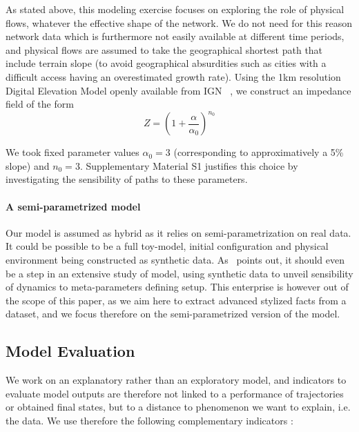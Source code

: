 \documentclass[Royal,sageh,times]{sagej}
\begin{document}
As stated above, this modeling exercise focuses on exploring the role of physical flows, whatever the effective shape of the network. We do not need for this reason network data which is furthermore not easily available at different time periods, and physical flows are assumed to take the geographical shortest path that include terrain slope (to avoid geographical absurdities such as cities with a difficult access having an overestimated growth rate). Using the 1km resolution Digital Elevation Model openly available from IGN~\cite{}%
, we construct an impedance field of the form
\[
Z = \left(1 + \frac{\alpha}{\alpha_0}\right)^{n_0}
\]

We took fixed parameter values $\alpha_0 = 3$ (corresponding to approximatively a 5\% slope) and $n_0 = 3$. Supplementary Material S1 justifies this choice by investigating the sensibility of paths to these parameters.




\paragraph{A semi-parametrized model}

Our model is assumed as hybrid as it relies on semi-parametrization on real data. It could be possible to be a full toy-model, initial configuration and physical environment being constructed as synthetic data. As~\cite{raimbault2016generation} points out, it should even be a step in an extensive study of model, using synthetic data to unveil sensibility of dynamics to meta-parameters defining setup. This enterprise is however out of the scope of this paper, as we aim here to extract advanced stylized facts from a dataset, and we focus therefore on the semi-parametrized version of the model.



\subsection{Model Evaluation}

We work on an explanatory rather than an exploratory model, and indicators to evaluate model outputs are therefore not linked to a performance of trajectories or obtained final states, but to a distance to phenomenon we want to explain, i.e. the data. We use therefore the following complementary indicators :
\end{document}

